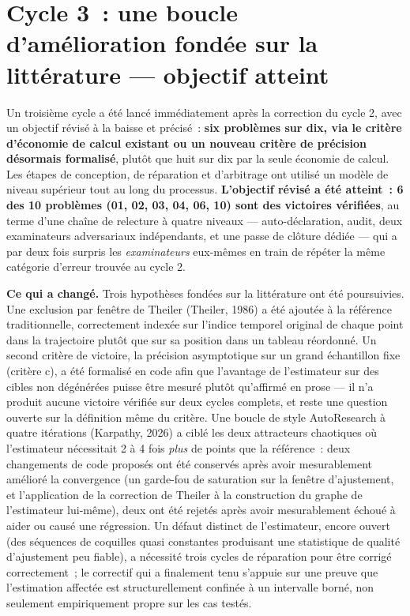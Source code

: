 \documentclass[11pt,a4paper]{article}
\begin{document}
\section{Cycle 3~: une boucle d'amélioration fondée sur la littérature --- objectif atteint}
\label{sec:cycle3}

Un troisième cycle a été lancé immédiatement après la correction du cycle
2, avec un objectif révisé à la baisse et précisé~: \textbf{six problèmes
sur dix, via le critère d'économie de calcul existant ou un nouveau
critère de précision désormais formalisé}, plutôt que huit sur dix par la
seule économie de calcul. Les étapes de conception, de réparation et
d'arbitrage ont utilisé un modèle de niveau supérieur tout au long du
processus. \textbf{L'objectif révisé a été atteint~: 6 des 10 problèmes
(01, 02, 03, 04, 06, 10) sont des victoires vérifiées}, au terme d'une
chaîne de relecture à quatre niveaux --- auto-déclaration, audit, deux
examinateurs adversariaux indépendants, et une passe de clôture dédiée ---
qui a par deux fois surpris les \emph{examinateurs} eux-mêmes en train de
répéter la même catégorie d'erreur trouvée au cycle 2.

\textbf{Ce qui a changé.} Trois hypothèses fondées sur la littérature ont
été poursuivies. Une exclusion par fenêtre de Theiler (Theiler, 1986) a
été ajoutée à la référence traditionnelle, correctement indexée sur
l'indice temporel original de chaque point dans la trajectoire plutôt que
sur sa position dans un tableau réordonné. Un second critère de
victoire, la précision asymptotique sur un grand échantillon fixe (critère
c), a été formalisé en code afin que l'avantage de l'estimateur sur des
cibles non dégénérées puisse être mesuré plutôt qu'affirmé en prose --- il
n'a produit aucune victoire vérifiée sur deux cycles complets, et reste
une question ouverte sur la définition même du critère. Une boucle de
style AutoResearch à quatre itérations (Karpathy, 2026) a ciblé les deux
attracteurs chaotiques où l'estimateur nécessitait 2 à 4 fois \emph{plus}
de points que la référence~: deux changements de code proposés ont été
conservés après avoir mesurablement amélioré la convergence (un garde-fou
de saturation sur la fenêtre d'ajustement, et l'application de la
correction de Theiler à la construction du graphe de l'estimateur
lui-même), deux ont été rejetés après avoir mesurablement échoué à aider
ou causé une régression. Un défaut distinct de l'estimateur, encore
ouvert (des séquences de coquilles quasi constantes produisant une
statistique de qualité d'ajustement peu fiable), a nécessité trois cycles
de réparation pour être corrigé correctement~; le correctif qui a
finalement tenu s'appuie sur une preuve que l'estimation affectée est
structurellement confinée à un intervalle borné, non seulement
empiriquement propre sur les cas testés.
\end{document}
